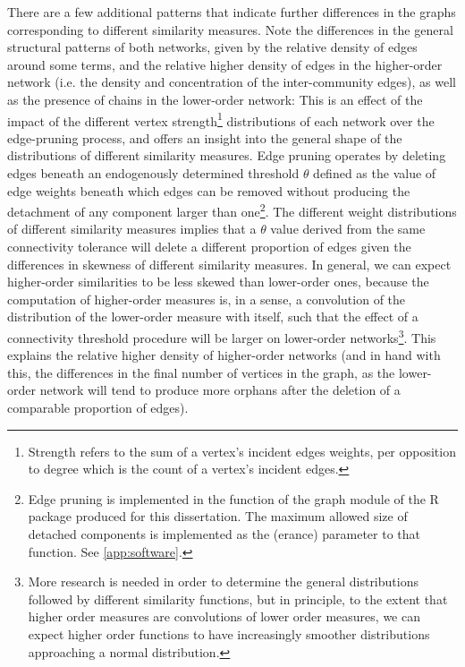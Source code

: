 There are a few additional patterns that indicate further differences in the graphs corresponding to different similarity measures.
Note the differences in the general structural patterns of both networks, given by the relative density of edges around some terms, and the relative higher density of edges in the higher-order network (i.e. the density and concentration of the inter-community edges), as well as the presence of chains in the lower-order network:
This is an effect of the impact of the different vertex strength\footnote{
    Strength refers to the sum of a vertex's incident edges weights, per opposition to degree which is the count of a vertex's incident edges.
} distributions of each network over the edge-pruning process, and offers an insight into the general shape of the distributions of different similarity measures.
Edge pruning operates by deleting edges beneath an endogenously determined threshold $\theta$ defined as the value of edge weights beneath which edges can be removed without producing the detachment of any component larger than one\footnote{
    Edge pruning is implemented in the  function of the graph module of the  R package produced for this dissertation.
    The maximum allowed size of detached components is implemented as the (erance) parameter to that function.
    See \autoref{app:software}.
}.
The different weight distributions of different similarity measures implies that a $\theta$ value derived from the same connectivity tolerance will delete a different proportion of edges given the differences in skewness of different similarity measures.
In general, we can expect higher-order similarities to be less skewed than lower-order ones, because the computation of higher-order measures is, in a sense, a convolution of the distribution of the lower-order measure with itself, such that the effect of a connectivity threshold procedure will be larger on lower-order networks\footnote{
    More research is needed in order to determine the general distributions followed by different similarity functions, but in principle, to the extent that higher order measures are convolutions of lower order measures, we can expect higher order functions to have increasingly smoother distributions approaching a normal distribution.
}.
This explains the relative higher density of higher-order networks (and in hand with this, the differences in the final number of vertices in the graph, as the lower-order network will tend to produce more orphans after the deletion of a comparable proportion of edges).
